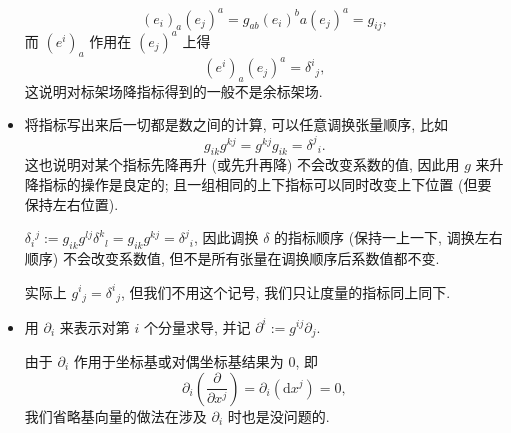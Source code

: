 \begin{itemize}
\begin{remark}
		\[ (e_i)_a(e_j)^{a}=g_{ab}(e_i)^{b}a(e_j)^{a}=g_{ij}, \] 
		而 $(e^i)_a$ 作用在 $(e_j)^{a}$ 上得 
		\[ (e^i)_a(e_j)^{a}=\delta^i{}_{j}, \]
		这说明对标架场降指标得到的一般不是余标架场.
	\end{remark}
	\item 将指标写出来后一切都是数之间的计算, 可以任意调换张量顺序, 比如 
	\[ g_{ik}g^{kj}=g^{kj}g_{ik}=\delta^{j}{}_{i}. \]
	这也说明对某个指标先降再升 (或先升再降) 不会改变系数的值, 因此用 $g$ 来升降指标的操作是良定的; 且一组相同的上下指标可以同时改变上下位置 (但要保持左右位置).
	\begin{remark}
		$ \delta_{i}{}^{j}:=g_{ik}g^{lj}\delta^{k}{}_{l}=g_{ik}g^{kj}=\delta^{j}{}_{i}$, 因此调换 $\delta$ 的指标顺序 (保持一上一下, 调换左右顺序) 不会改变系数值, 但不是所有张量在调换顺序后系数值都不变.
	\end{remark}
	\begin{remark}
		实际上 $g^i{}_j=\delta^{i}{}_j$, 但我们不用这个记号, 我们只让度量的指标同上同下.
	\end{remark}
	\item 用 $ \partial_i $ 来表示对第 $i$ 个分量求导, 并记 $\partial^i:=g^{ij}\partial_j$.
	\begin{remark}
	由于 $ \partial_i $ 作用于坐标基或对偶坐标基结果为 $ 0 $, 即 
    \[ \partial_i \left( \frac{\partial}{\partial x^{j}} \right) =\partial_i(\mathrm{d}x^j)=0,\]
    我们省略基向量的做法在涉及 $\partial_i$ 时也是没问题的.
\end{remark}
\end{itemize}

